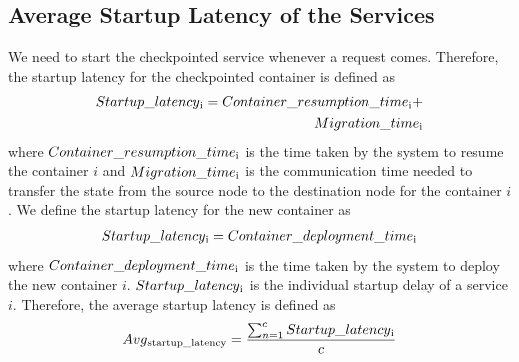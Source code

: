 \documentclass[conference]{IEEEtran}
\begin{document}
\subsection{Average Startup Latency of the Services}
We need to start the checkpointed service whenever a
request comes. Therefore, the startup latency for the checkpointed container is defined as
\begin{align*} Startup\_latency\textsubscript{i} = Container\_resumption\_time\textsubscript{i}+
\\ Migration\_time\textsubscript{i}\end{align*}
where \begin{math} Container\_resumption\_time\textsubscript{i}\end{math} is the time taken by
the system to resume the container \begin{math} i \end{math} and \begin{math} Migration\_time\textsubscript{i} \end{math} is the communication time needed to transfer the state from
the source node to the destination node for the container \begin{math}i \end{math}. We define the startup latency for the new container as \begin{align*} Startup\_latency\textsubscript{i} = Container\_deployment\_time\textsubscript{i}\end{align*} where \begin{math} Container\_deployment\_time\textsubscript{i} \end{math} is the time taken by
the system to deploy the new container \begin{math} i \end{math}. \begin{math}Startup\_latency\textsubscript{i} \end{math} is the individual startup delay of a service \begin{math} i \end{math}. Therefore, the
average startup latency is defined as \begin{align*} Avg\textsubscript{startup\_latency} =\frac {\sum_{n=1}^{c} Startup\_latency\textsubscript{i}} {c} \end{align*}
\end{document}
